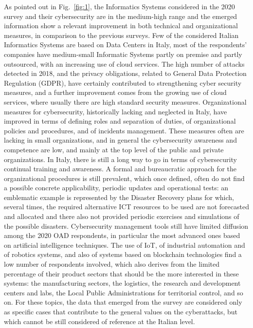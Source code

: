 \documentclass{easychair}
\begin{document}
As pointed out in Fig.~\ref{fig:1}, the Informatics Systems considered in the 2020 survey and their cybersecurity  are in the medium-high range and the emerged information show a relevant 
improvement in both technical and organizational measures, in comparison to the previous surveys. Few of the considered Italian Informatics Systems are based on Data Centers in 
Italy, most of the respondents’ companies have medium-small Informatic Systems partly on premise and partly outsourced, with an increasing use of cloud services.
The high number of attacks detected in 2018, and the privacy obligations, related to General Data Protection Regulation (GDPR), have certainly contributed to strengthening cyber security measures, and a further improvement 
comes from the growing use of cloud services, where usually there are high standard security measures. Organizational measures for cybersecurity, historically lacking and neglected
in Italy, have improved in terms of defining roles and separation of duties, of organizational policies and procedures, and of incidents management. These measures often are lacking
in small organizations, and in general the cybersecurity awareness and competence are low, and mainly at the top level of the public and private organizations. In Italy, there is 
still a long way to go in terms of cybersecurity continual training and awareness. A formal and bureaucratic approach for the organizational procedures is still prevalent, which 
once defined, often do not find a possible concrete applicability, periodic updates and operational tests: an emblematic example is represented by the Disaster Recovery plans for 
which, several times, the required alternative ICT resources to be used are not forecasted and allocated and there also not provided periodic exercises and simulations of the 
possible disasters. Cybersecurity management tools still have limited diffusion among the 2020 OAD respondents, in particular the most advanced ones based on artificial intelligence
techniques. The use of IoT, of industrial automation and of robotics systems, and also of systems based on blockchain technologies find a low number of respondents involved, which 
also derives from the limited percentage of their product sectors that should be the more interested in these systems: the manufacturing sectors, the logistics, the research and 
development centers and labs, the Local Public Administrations for territorial control, and so on. For these topics, the data that emerged from the survey are considered only as 
specific cases that contribute to the general values on the cyberattacks, but which cannot be still considered of reference at the Italian level.
\end{document}
